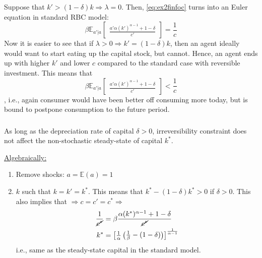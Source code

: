 \documentclass[]{article}
\begin{document}
Suppose that $k' > (1 - \delta)k \Rightarrow \lambda = 0$. Then, \eqref{eq:ex2finfoc} turns into an Euler equation in standard RBC model:
\begin{equation}
	\beta\mathbb{E}_{a'|a}\begin{bmatrix}\frac{a'\alpha(k')^{\alpha - 1} + 1 - \delta}{c'}\end{bmatrix} = \frac{1}{c} \nonumber
\end{equation}
Now it is easier to see that if $\lambda > 0 \Rightarrow k' = (1 - \delta)k$, then an agent ideally would want to start eating up the capital stock, but cannot. Hence, an agent ends up with higher $k'$ and lower $c$ compared to the standard case with reversible investment. This means that
\begin{equation}
	\beta\mathbb{E}_{a'|a}\begin{bmatrix}\frac{a'\alpha(k')^{\alpha - 1} + 1 - \delta}{c'}\end{bmatrix} < \frac{1}{c} \nonumber
\end{equation}
, i.e., again consumer would have been better off consuming more today, but is bound to postpone consumption to the future period.

\subsubsection{}
As long as the depreciation rate of capital $\delta > 0$, irreversibility constraint does not affect the non-stochastic steady-state of capital $k^*$.

\underline{Algebraically:}
\begin{enumerate}
	\item Remove shocks: $a = \mathbb{E}(a) = 1$
	\item $k$ such that $k = k' = k^*$. This means that $k^* - (1 - \delta)k^* > 0$ if $\delta > 0$. This also implies that $\Rightarrow c = c' = c^* \Longrightarrow$
	\begin{equation}
		\begin{split}
			\frac{1}{\cancel{c^*}}& = \beta\frac{\alpha(k^*)^{\alpha - 1} + 1 - \delta}{\cancel{c^*}} \nonumber \\
			k^*& = \begin{bmatrix}\frac{1}{\alpha}\begin{pmatrix}\frac{1}{\beta} - (1 - \delta)\end{pmatrix}\end{bmatrix}^{\frac{1}{\alpha - 1}}
		\end{split}
	\end{equation}
	i.e., same as the steady-state capital in the standard model.
\end{enumerate}
\end{document}
